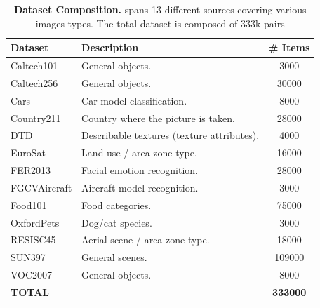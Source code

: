 \begin{table}[ht]
\small
\setlength{\tabcolsep}{6pt}
\renewcommand{\arraystretch}{1.15}
\begin{tabularx}{\textwidth}{l X S[table-format=6.0]}
\toprule
\textbf{Dataset} & \textbf{Description} & {\textbf{\# Items}} \\
\midrule
Caltech101      & General objects.                                                                  & 3000   \\
Caltech256      & General objects.                                                                  & 30000  \\
Cars            & Car model classification.                                                         & 8000   \\
Country211      & Country where the picture is taken.                                               & 28000  \\
DTD             & Describable textures (texture attributes).                                        & 4000   \\
EuroSat         & Land use / area zone type.                                                        & 16000  \\
FER2013         & Facial emotion recognition.                                                       & 28000  \\
FGCVAircraft    & Aircraft model recognition.                                                       & 3000   \\
Food101         & Food categories.                                                                  & 75000  \\
OxfordPets      & Dog/cat species.                                                                  & 3000   \\
RESISC45        & Aerial scene / area zone type.                                                    & 18000  \\
SUN397          & General scenes.                                                                   & 109000 \\
VOC2007         & General objects.                                                                  & 8000   \\
\midrule
\textbf{TOTAL}  &                                                                                   & \textbf{333000} \\
\bottomrule
\end{tabularx}
\caption{\textbf{\natcap{} Dataset Composition.} \natcap{} spans 13 different sources covering various images types. The total dataset is composed of 333k pairs}
\label{tab:natcap}
\end{table}


